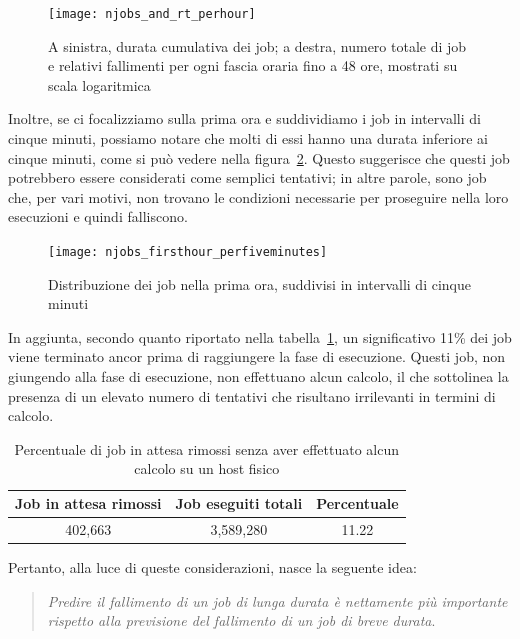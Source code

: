 \begin{figure}[p]
    \centering
    \texttt{[image: njobs\_and\_rt\_perhour]}
    \caption{\small A sinistra, durata cumulativa dei job; a destra, numero
    totale di job e relativi fallimenti per ogni fascia oraria fino a 48 ore,
mostrati su scala logaritmica}
    \label{fig:njobs_and_rt_perhour}
\end{figure}

Inoltre, se ci focalizziamo sulla prima ora e suddividiamo i job in intervalli
di cinque minuti, possiamo notare che molti di essi hanno una durata inferiore
ai cinque minuti, come si può vedere nella figura~\ref{fig:jobs_firsthour}.
Questo suggerisce che questi job potrebbero essere considerati come semplici
tentativi; in altre parole, sono job che, per vari motivi, non trovano le
condizioni necessarie per proseguire nella loro esecuzioni e quindi
falliscono.

\begin{figure}[p]
   \centering
   \texttt{[image: njobs\_firsthour\_perfiveminutes]}
   \caption{\small Distribuzione dei job nella prima ora, suddivisi in intervalli di
   cinque minuti}
   \label{fig:jobs_firsthour}
\end{figure}

In aggiunta, secondo quanto riportato nella
tabella~\ref{table:pending_jobs_removed}, un significativo 11\% dei job viene
terminato ancor prima di raggiungere la fase di esecuzione. Questi job, non
giungendo alla fase di esecuzione, non effettuano alcun calcolo, il che
sottolinea la presenza di un elevato numero di tentativi che risultano
irrilevanti in termini di calcolo.

\begin{table}[!ht]
    \caption{Percentuale di job in attesa rimossi senza aver effettuato alcun
    calcolo su un host fisico}
    \centering
    \begin{tabular}{ccc}
        \toprule
        \textbf{Job in attesa rimossi} & \textbf{Job eseguiti totali} &
        \textbf{Percentuale} \\
        \midrule
        402,663 & 3,589,280 & 11.22 \\
        \bottomrule
    \end{tabular}
    \label{table:pending_jobs_removed}
\end{table}

Pertanto, alla luce di queste considerazioni, nasce la seguente idea:
\begin{quote}
    \emph{Predire il fallimento di un job di lunga durata è nettamente più
    importante rispetto alla previsione del fallimento di un job di breve durata}.
\end{quote}

